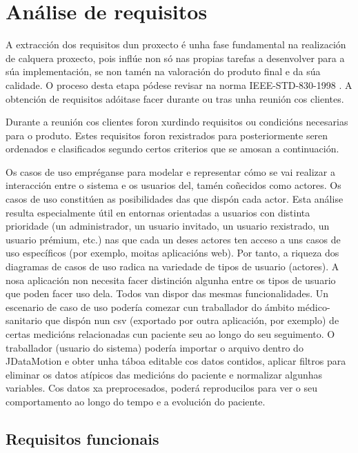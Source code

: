 \chapter{Análise de requisitos}

A extracción dos requisitos dun proxecto é unha fase fundamental na realización de calquera proxecto, pois inflúe non só nas propias tarefas a desenvolver para a súa implementación, se non tamén na valoración do produto final e da súa calidade. O proceso desta etapa pódese revisar na norma IEEE-STD-830-1998 \cite{ieee-std-830-1998}. A obtención de requisitos adóitase facer durante ou tras unha reunión cos clientes.

Durante a reunión cos clientes foron xurdindo requisitos ou condicións necesarias para o produto. Estes requisitos foron rexistrados para posteriormente seren ordenados e clasificados segundo certos criterios que se amosan a continuación.

Os casos de uso empréganse para modelar e representar cómo se vai realizar a interacción entre o sistema e os usuarios del, tamén coñecidos como actores. Os casos de uso constitúen as posibilidades das que dispón cada actor. Esta análise resulta especialmente útil en entornas orientadas a usuarios con distinta prioridade (un administrador, un usuario invitado, un usuario rexistrado, un usuario prémium, etc.) nas que cada un deses actores ten acceso a uns casos de uso específicos (por exemplo, moitas aplicacións web). Por tanto, a riqueza dos diagramas de casos de uso radica na variedade de tipos de usuario (actores). A nosa aplicación non necesita facer distinción algunha entre os tipos de usuario que poden facer uso dela. Todos van dispor das mesmas funcionalidades. Un escenario de caso de uso podería comezar cun traballador do ámbito médico-sanitario que dispón nun csv (exportado por outra aplicación, por exemplo) de certas medicións relacionadas cun paciente seu ao longo do seu seguimento. O traballador (usuario do sistema) podería importar o arquivo dentro do JDataMotion e obter unha táboa editable cos datos contidos, aplicar filtros para eliminar os datos atípicos das medicións do paciente e normalizar algunhas variables. Cos datos xa preprocesados, poderá reproducilos para ver o seu comportamento ao longo do tempo e a evolución do paciente.

\section{Requisitos funcionais}

